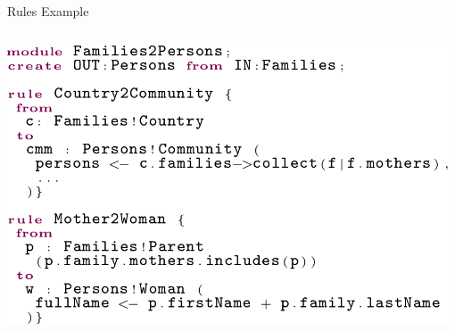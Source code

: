 \documentclass[12pt, handout]{beamer}
\begin{document}
\begin{frame}{Rules Example}
\begin{columns}[T] %
     \begin{column}[T]{0.5\textwidth} %
     \begin{center}
     
\includegraphics[width=0.98\textwidth]{figures/ATL_example}


\end{center}
\end{column}
\end{columns}
\end{frame}
\end{document}
